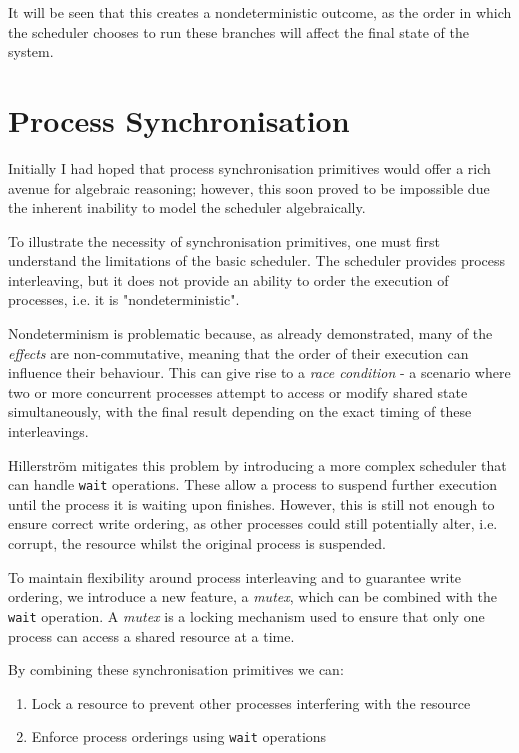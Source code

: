 \documentclass[logo,bsc,singlespacing,parskip]{infthesis}
\begin{document}
It will be seen that this creates a nondeterministic outcome, as the order in which the scheduler chooses to run these branches will affect the final state of the system. 



\section{Process Synchronisation}
\label{process-synchronisation}

Initially I had hoped that process synchronisation primitives would offer a rich avenue for algebraic reasoning; however, this soon proved to be impossible due the inherent inability to model the scheduler algebraically.

To illustrate the necessity of synchronisation primitives, one must first understand the limitations of the basic scheduler. The scheduler provides process interleaving, but it does not provide an ability to order the execution of processes, i.e. it is "nondeterministic". 

Nondeterminism is problematic because, as already demonstrated, many of the \textit{effects} are non-commutative, meaning that the order of their execution can influence their behaviour. This can give rise to a \textit{race condition} - a scenario where two or more concurrent processes attempt to access or modify shared state simultaneously, with the final result depending on the exact timing of these interleavings.

Hillerström mitigates this problem by introducing a more complex scheduler that can handle \lstinline{wait} operations. These allow a process to suspend further execution until the process it is waiting upon finishes. However, this is still not enough to ensure correct write ordering, as other processes could still potentially alter, i.e. corrupt, the resource whilst the original process is suspended.  

To maintain flexibility around process interleaving and to guarantee write ordering, we introduce a new feature, a \textit{mutex}, which can be combined with the \lstinline{wait} operation. A \textit{mutex} is a locking mechanism used to ensure that only one process can access a shared resource at a time.


By combining these synchronisation primitives we can:
\begin{enumerate}
    \item Lock a resource to prevent other processes interfering with the resource
    \item Enforce process orderings using \lstinline{wait} operations
\end{enumerate}
\end{document}
